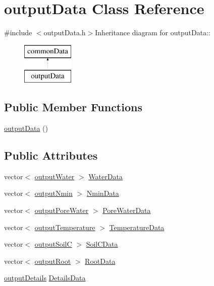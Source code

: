 \hypertarget{classoutput_data}{
\section{outputData Class Reference}
\label{classoutput_data}
}


{\ttfamily \#include $<$outputData.h$>$}Inheritance diagram for outputData::\begin{figure}[H]
\begin{center}
\leavevmode
\includegraphics[height=2cm]{classoutput_data}
\end{center}
\end{figure}
\subsection*{Public Member Functions}
\begin{DoxyCompactItemize}
\item 
\hyperlink{classoutput_data_a47c95333a048b1978d7cc4871d7c5230}{outputData} ()
\end{DoxyCompactItemize}
\subsection*{Public Attributes}
\begin{DoxyCompactItemize}
\item 
vector$<$ \hyperlink{classoutput_water}{outputWater} $>$ \hyperlink{classoutput_data_a354085135b0a0a2b6bb245dff6779073}{WaterData}
\item 
vector$<$ \hyperlink{classoutput_nmin}{outputNmin} $>$ \hyperlink{classoutput_data_a213ddbf3e83fe1f17f12994794ae649d}{NminData}
\item 
vector$<$ \hyperlink{classoutput_pore_water}{outputPoreWater} $>$ \hyperlink{classoutput_data_a9049c356d01885832d2118f58ed94bba}{PoreWaterData}
\item 
vector$<$ \hyperlink{classoutput_temperature}{outputTemperature} $>$ \hyperlink{classoutput_data_a3e8cb56e571046aa8b37a4260a062594}{TemperatureData}
\item 
vector$<$ \hyperlink{classoutput_soil_c}{outputSoilC} $>$ \hyperlink{classoutput_data_aa4e17ffda4c4dde9a0796d35707f6067}{SoilCData}
\item 
vector$<$ \hyperlink{classoutput_root}{outputRoot} $>$ \hyperlink{classoutput_data_a52a733aa57217c278df4d06e50c48ad8}{RootData}
\item 
\hyperlink{classoutput_details}{outputDetails} \hyperlink{classoutput_data_ae50b979972f6c57c3881edd6a7dd96b4}{DetailsData}
\end{DoxyCompactItemize}
